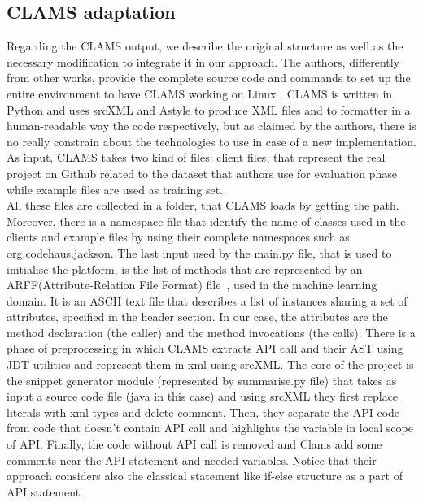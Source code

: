 \subsection{CLAMS adaptation}
Regarding the CLAMS output, we describe the original structure as well as the necessary modification to integrate it in our approach. The authors, differently from other works, provide the complete source code and commands to set up the entire environment to have CLAMS working on Linux . CLAMS is written in Python and uses srcXML and Astyle to produce XML files and to formatter in a human-readable way the code respectively, but as claimed by the authors, there is no really constrain about the technologies to use in case of a new implementation. As input, CLAMS takes two kind of files: client files, that represent the real project on Github related to the dataset that authors use for evaluation phase while example files are used as training set.\\ 
All these files are collected in a folder, that CLAMS loads by getting the path. Moreover, there is a namespace file that identify the name of classes used in the clients and example files by using their complete namespaces such as org.codehaus.jackson. The last input used by the main.py file, that is used to initialise the platform, is the list of methods that are represented by an ARFF(Attribute-Relation File Format) file~\cite{https://www.cs.waikato.ac.nz_last_nodate}, used in the machine learning domain. It is an ASCII text file that describes a list of instances sharing a set of attributes, specified in the header section. In our case, the attributes are the method declaration (the caller) and the method invocations (the calls). 
\newline
There is a phase of preprocessing in which CLAMS extracts API call and their AST using JDT utilities and represent them in xml using srcXML. The core of the project is the snippet generator module (represented by summarise.py file) that takes as input a source code file (java in this case) and using srcXML they first replace literals with xml types and delete comment. Then, they separate the API code from code that doesn't contain API call and highlights the variable in local scope of API. Finally, the code without API call is removed and Clams add some comments near the API statement and needed variables. Notice that their approach considers also the classical statement like if-else structure as a part of API statement. \\
